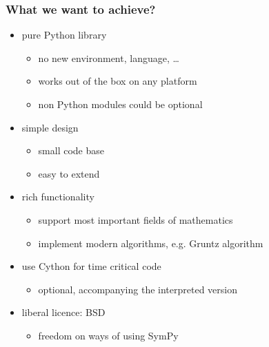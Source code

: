 \documentclass{beamer}
\begin{document}
\begin{frame}[fragile]
    \frametitle{What we want to achieve?}

    \begin{itemize}
        \item<1-> pure Python library
            \begin{itemize}
                \item no new environment, language, \ldots
                \item works out of the box on any platform
                \item non Python modules could be optional
            \end{itemize}
        \item<2-> simple design
            \begin{itemize}
                \item small code base
                \item easy to extend
            \end{itemize}
        \item<3-> rich functionality
            \begin{itemize}
                \item support most important fields of mathematics
                \item implement modern algorithms, e.g. Gruntz algorithm
            \end{itemize}
        \item<4-> use Cython for time critical code
            \begin{itemize}
                \item optional, accompanying the interpreted version
            \end{itemize}
        \item<5-> liberal licence: BSD
            \begin{itemize}
                \item freedom on ways of using SymPy
            \end{itemize}
    \end{itemize}
\end{frame}
\end{document}
